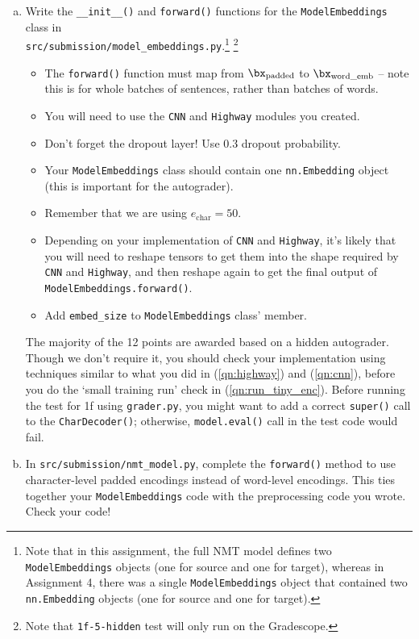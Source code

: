 \begin{enumerate}[(a)]
    \item {} Write the \texttt{\_\_init\_\_()} and \texttt{forward()} functions for the \texttt{ModelEmbeddings} class in \\
        \texttt{src/submission/model\_embeddings.py}.\footnote{Note that in this assignment, the full NMT model defines two \texttt{ModelEmbeddings} objects (one for source and one for target), whereas in Assignment 4, there was a single \texttt{ModelEmbeddings} object that contained two \texttt{nn.Embedding} objects (one for source and one for target).} \footnote{Note that \texttt{1f-5-hidden} test will only run on the Gradescope.}
    \begin{itemize}
        \item The \texttt{forward()} function must map from $\bx_\text{padded}$ to $\bx_\text{word\_emb}$ -- note this is for whole batches of sentences, rather than batches of words.
        \item You will need to use the \texttt{CNN} and \texttt{Highway} modules you created.
        \item Don't forget the dropout layer! Use 0.3 dropout probability.
        \item Your \texttt{ModelEmbeddings} class should contain one \texttt{nn.Embedding} object (this is important for the autograder).
        \item Remember that we are using $e_\text{char}=50$.
        \item Depending on your implementation of \texttt{CNN} and \texttt{Highway}, it's likely that you will need to reshape tensors to get them into the shape required by \texttt{CNN} and \texttt{Highway}, and then reshape again to get the final output of \texttt{ModelEmbeddings.forward()}.
        \item Add \texttt{embed\_size} to \texttt{ModelEmbeddings} class' member.
    \end{itemize}
    
        The majority of the 12 points are awarded based on a hidden autograder. Though we don't require it, you should check your implementation using techniques similar to what you did in (\ref{qn:highway}) and (\ref{qn:cnn}), before you do the `small training run' check in (\ref{qn:run_tiny_enc}). Before running the test for 1f using \texttt{grader.py}, you might want to add a correct \texttt{super()} call to the \texttt{CharDecoder()}; otherwise, \texttt{model.eval()} call in the test code would fail.

    \item {}
    In \texttt{src/submission/nmt\_model.py}, complete the \texttt{forward()} method to use character-level padded encodings instead of word-level encodings.
    This ties together your \texttt{ModelEmbeddings} code with the preprocessing code you wrote. Check your code!
    

\end{enumerate}
